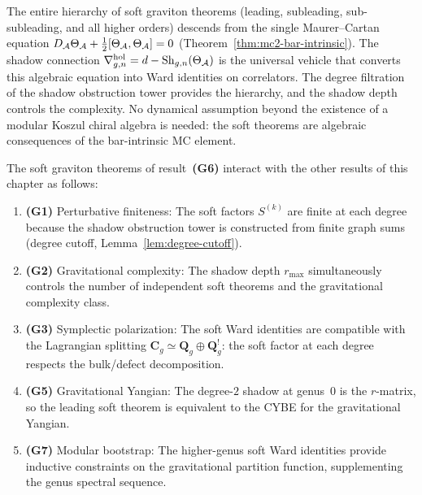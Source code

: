 \begin{remark}
\label{rem:thqg-VI-single-equation}
The entire hierarchy of soft graviton theorems (leading,
subleading, sub-subleading, and all higher orders) descends from
the single Maurer--Cartan equation
$D_{\mathcal{A}}\Theta_{\mathcal{A}} + \tfrac{1}{2}[\Theta_{\mathcal{A}},\Theta_{\mathcal{A}}] = 0$
(Theorem~\ref{thm:mc2-bar-intrinsic}). The shadow connection
$\nabla^{\mathrm{hol}}_{g,n} = d - \operatorname{Sh}_{g,n}(\Theta_{\mathcal{A}})$ is
the universal vehicle that converts this algebraic equation into
Ward identities on correlators. The degree filtration of the
shadow obstruction tower provides the hierarchy, and the shadow
depth controls the complexity. No dynamical assumption beyond
the existence of a modular Koszul chiral algebra is needed:
the soft theorems are algebraic consequences of the bar-intrinsic
MC element.
\end{remark}

\begin{remark}
\label{rem:thqg-VI-other-results}
The soft graviton theorems of result~\textbf{(G6)} interact with
the other results of this chapter as follows:
\begin{enumerate}[label=\textup{(\alph*)}]
\item \textbf{(G1)} Perturbative finiteness: The soft factors
 $S^{(k)}$ are finite at each degree because the shadow
 obstruction tower is constructed from finite graph sums
 (degree cutoff, Lemma~\ref{lem:degree-cutoff}).
\item \textbf{(G2)} Gravitational complexity: The shadow depth
 $r_{\max}$ simultaneously controls the number of independent
 soft theorems and the gravitational complexity class.
\item \textbf{(G3)} Symplectic polarization: The soft Ward
 identities are compatible with the Lagrangian splitting
 $\mathbf{C}_g \simeq \mathbf{Q}_g \oplus \mathbf{Q}_g^!$:
 the soft factor at each degree respects the bulk/defect
 decomposition.
\item \textbf{(G5)} Gravitational Yangian: The degree-$2$ shadow
 at genus~$0$ is the $r$-matrix, so the leading soft theorem
 is equivalent to the CYBE for the gravitational Yangian.
\item \textbf{(G7)} Modular bootstrap: The higher-genus soft
 Ward identities provide inductive constraints on the
 gravitational partition function, supplementing the genus
 spectral sequence.
\end{enumerate}
\end{remark}

